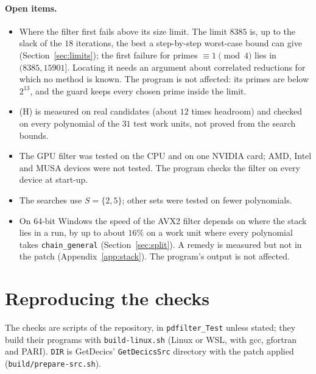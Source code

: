 \documentclass[10pt,a4paper]{article}
\newcommand{\code}[1]{\texttt{#1}}
\theoremstyle{plain}
\theoremstyle{definition}
\begin{document}
\paragraph{Open items.}
\begin{itemize}
\item Where the filter first fails above its size limit.  The limit $8385$ is, up to the slack of the $18$ iterations, the best a step-by-step worst-case bound
  can give (Section~\ref{sec:limits}); the first failure for primes $\equiv1\pmod4$ lies in $(8385,15901]$.  Locating it needs an argument about correlated
  reductions for which no method is known.  The program is not affected: its primes are below $2^{13}$, and the guard keeps every chosen prime inside the limit.
\item (H) is measured on real candidates (about $12$ times headroom) and checked on every polynomial of the $31$ test work units, not proved from the search bounds.
\item The GPU filter was tested on the CPU and on one NVIDIA card; AMD, Intel and MUSA devices were not tested.  The program checks the filter on every device at
  start-up.
\item The searches use $S=\{2,5\}$; other sets were tested on fewer polynomials.
\item On 64-bit Windows the speed of the AVX2 filter depends on where the stack lies in a run, by up to about $16\%$ on a work unit where every polynomial takes
  \code{chain\_general} (Section~\ref{sec:split}).  A remedy is measured but not in the patch (Appendix~\ref{app:stack}).  The program's output is not affected.
\end{itemize}

\appendix
\section{Reproducing the checks}\label{app:reproduce}

The checks are scripts of the repository, in \code{pdfilter\_Test} unless stated; they build their programs with \code{build-linux.sh} (Linux or WSL, with gcc,
gfortran and PARI).  \code{DIR} is GetDecics' \code{GetDecicsSrc} directory with the patch applied (\code{build/prepare-src.sh}).
\end{document}
